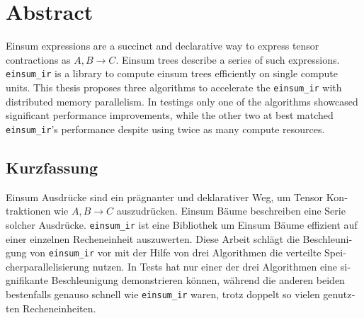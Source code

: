 \thispagestyle{empty} 

\section*{Abstract}

Einsum expressions are a succinct and declarative way to express tensor contractions as $A,B \rightarrow C$.
Einsum trees describe a series of such expressions.
\texttt{einsum\_ir} \cite{einsum_ir} is a library to compute einsum trees efficiently on single compute units.
This thesis proposes three algorithms to accelerate the \texttt{einsum\_ir} with distributed memory parallelism.
In testings only one of the algorithms showcased significant performance improvements, while the other two at best matched \texttt{einsum\_ir}'s performance despite using twice as many compute resources.

\thispagestyle{empty} 

\begin{otherlanguage}{ngerman}
\section*{Kurzfassung}
Einsum Ausdrücke sind ein prägnanter und deklarativer Weg, um Tensor Kontraktionen wie $A,B \rightarrow C$ auszudrücken.
Einsum Bäume beschreiben eine Serie solcher Ausdrücke.
\texttt{einsum\_ir} \cite{einsum_ir} ist eine Bibliothek um Einsum Bäume effizient auf einer einzelnen Recheneinheit auszuwerten.
Diese Arbeit schlägt die Beschleunigung von \texttt{einsum\_ir} vor mit der Hilfe von drei Algorithmen die verteilte Speicherparallelisierung nutzen.
In Tests hat nur einer der drei Algorithmen eine signifikante Beschleunigung demonstrieren können, während die anderen beiden bestenfalls genauso schnell wie \texttt{einsum\_ir} waren, trotz doppelt so vielen genutzten Recheneinheiten.
\end{otherlanguage}
